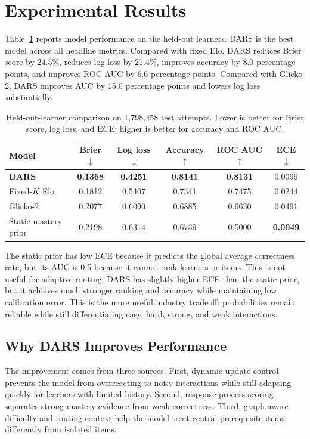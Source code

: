 \documentclass[conference]{IEEEtran}
\begin{document}
\section{Experimental Results}
Table~\ref{tab:results} reports model performance on the held-out learners. DARS is the best model across all headline metrics. Compared with fixed Elo, DARS reduces Brier score by 24.5\%, reduces log loss by 21.4\%, improves accuracy by 8.0 percentage points, and improves ROC AUC by 6.6 percentage points. Compared with Glicko-2, DARS improves AUC by 15.0 percentage points and lowers log loss substantially.

\begin{table}[t]
\caption{Held-out-learner comparison on 1,798,458 test attempts. Lower is better for Brier score, log loss, and ECE; higher is better for accuracy and ROC AUC.}
\label{tab:results}
\centering
\begin{tabular}{lccccc}
\toprule
\textbf{Model} & \textbf{Brier} $\downarrow$ & \textbf{Log loss} $\downarrow$ & \textbf{Accuracy} $\uparrow$ & \textbf{ROC AUC} $\uparrow$ & \textbf{ECE} $\downarrow$ \\
\midrule
\textbf{DARS} & \textbf{0.1368} & \textbf{0.4251} & \textbf{0.8141} & \textbf{0.8131} & 0.0096 \\
Fixed-$K$ Elo & 0.1812 & 0.5407 & 0.7341 & 0.7475 & 0.0244 \\
Glicko-2 & 0.2077 & 0.6090 & 0.6885 & 0.6630 & 0.0491 \\
Static mastery prior & 0.2198 & 0.6314 & 0.6739 & 0.5000 & \textbf{0.0049} \\
\bottomrule
\end{tabular}
\end{table}

The static prior has low ECE because it predicts the global average correctness rate, but its AUC is 0.5 because it cannot rank learners or items. This is not useful for adaptive routing. DARS has slightly higher ECE than the static prior, but it achieves much stronger ranking and accuracy while maintaining low calibration error. This is the more useful industry tradeoff: probabilities remain reliable while still differentiating easy, hard, strong, and weak interactions.

\subsection{Why DARS Improves Performance}
The improvement comes from three sources. First, dynamic update control prevents the model from overreacting to noisy interactions while still adapting quickly for learners with limited history. Second, response-process scoring separates strong mastery evidence from weak correctness. Third, graph-aware difficulty and routing context help the model treat central prerequisite items differently from isolated items.
\end{document}
